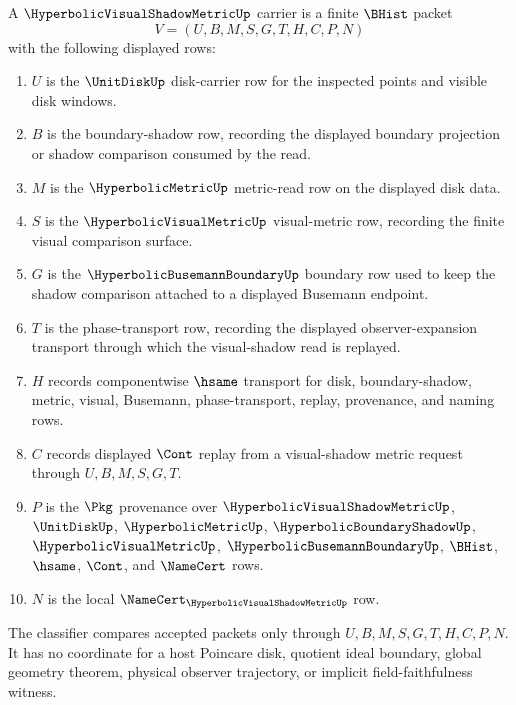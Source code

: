 \begin{definition}
\label{def:hyperbolic-visual-shadow-metric-carrier}
A $\HyperbolicVisualShadowMetricUp$ carrier is a finite $\BHist$ packet
$$
V=(U,B,M,S,G,T,H,C,P,N)
$$
with the following displayed rows:
\begin{enumerate}
\item $U$ is the $\UnitDiskUp$ disk-carrier row for the inspected points and visible disk windows.
\item $B$ is the boundary-shadow row, recording the displayed boundary projection or shadow comparison consumed by the read.
\item $M$ is the $\HyperbolicMetricUp$ metric-read row on the displayed disk data.
\item $S$ is the $\HyperbolicVisualMetricUp$ visual-metric row, recording the finite visual comparison surface.
\item $G$ is the $\HyperbolicBusemannBoundaryUp$ boundary row used to keep the shadow comparison attached to a displayed Busemann endpoint.
\item $T$ is the phase-transport row, recording the displayed observer-expansion transport through which the visual-shadow read is replayed.
\item $H$ records componentwise $\hsame$ transport for disk, boundary-shadow, metric, visual, Busemann, phase-transport, replay, provenance, and naming rows.
\item $C$ records displayed $\Cont$ replay from a visual-shadow metric request through $U,B,M,S,G,T$.
\item $P$ is the $\Pkg$ provenance over $\HyperbolicVisualShadowMetricUp$, $\UnitDiskUp$, $\HyperbolicMetricUp$, $\HyperbolicBoundaryShadowUp$, $\HyperbolicVisualMetricUp$, $\HyperbolicBusemannBoundaryUp$, $\BHist$, $\hsame$, $\Cont$, and $\NameCert$ rows.
\item $N$ is the local $\NameCert_{\HyperbolicVisualShadowMetricUp}$ row.
\end{enumerate}
The classifier compares accepted packets only through $U,B,M,S,G,T,H,C,P,N$. It has no coordinate for a host Poincare disk, quotient ideal boundary, global geometry theorem, physical observer trajectory, or implicit field-faithfulness witness.
\end{definition}

